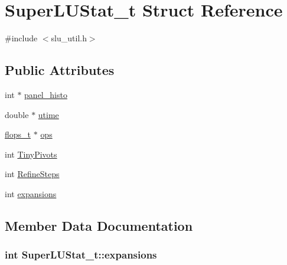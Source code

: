 \hypertarget{structSuperLUStat__t}{}\section{Super\+L\+U\+Stat\+\_\+t Struct Reference}
\label{structSuperLUStat__t}


{\ttfamily \#include $<$slu\+\_\+util.\+h$>$}

\subsection*{Public Attributes}
\begin{DoxyCompactItemize}
\item 
int $\ast$ \hyperlink{structSuperLUStat__t_a9a15399d38ecaf731ec300977f268b75}{panel\+\_\+histo}
\item 
double $\ast$ \hyperlink{structSuperLUStat__t_a5eccc9eba32b749c87f7a97991cfdc18}{utime}
\item 
\hyperlink{slu__util_8h_aaae6020bb33e780ff6edbd4e45ce08ac}{flops\+\_\+t} $\ast$ \hyperlink{structSuperLUStat__t_aec6afa389e49ac9d04dc44e24805c99d}{ops}
\item 
int \hyperlink{structSuperLUStat__t_ad752e80fc9fa85195ec9c0e9a17b481c}{Tiny\+Pivots}
\item 
int \hyperlink{structSuperLUStat__t_a472eadaf612c983b8829ae40b09f411b}{Refine\+Steps}
\item 
int \hyperlink{structSuperLUStat__t_ab0281af9350a75b2d4a3108b8bc0bf23}{expansions}
\end{DoxyCompactItemize}


\subsection{Member Data Documentation}
\hypertarget{structSuperLUStat__t_ab0281af9350a75b2d4a3108b8bc0bf23}{}
\subsubsection[{expansions}]{\setlength{\rightskip}{0pt plus 5cm}int Super\+L\+U\+Stat\+\_\+t\+::expansions}\label{structSuperLUStat__t_ab0281af9350a75b2d4a3108b8bc0bf23}
\hypertarget{structSuperLUStat__t_aec6afa389e49ac9d04dc44e24805c99d}{}

